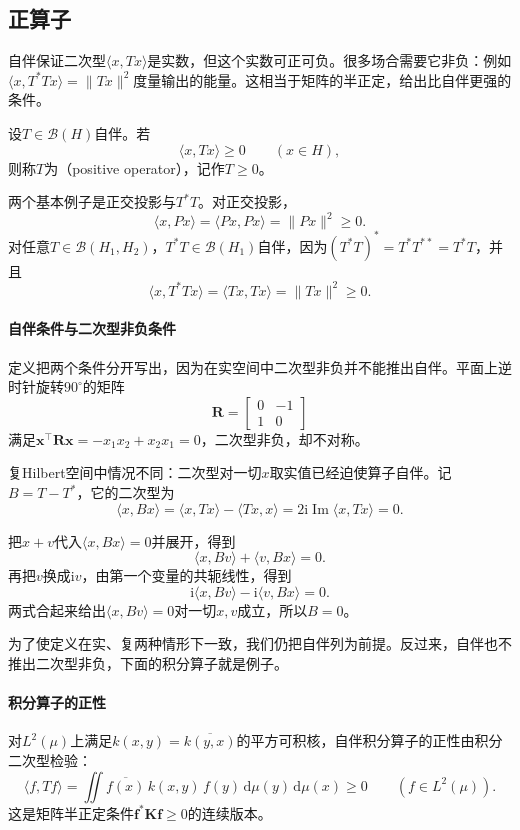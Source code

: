 \subsection{正算子}
\label{sec:lop-positive}

自伴保证二次型$\langle x,Tx\rangle$是实数，但这个实数可正可负。很多场合需要它非负：例如$\langle x,T^*Tx\rangle=\lVert Tx\rVert^2$度量输出的能量。这相当于矩阵的半正定，给出比自伴更强的条件。

\begin{definition}[正算子]
\label{def:lop-positive-operator}
设$T\in\mathcal B(H)$自伴。若
\begin{equation}
 \langle x,Tx\rangle\geq0\qquad(x\in H),
 \label{eq:lop-positive}
\end{equation}
则称$T$为（positive operator），记作$T\geq0$。
\end{definition}

两个基本例子是正交投影与$T^*T$。对正交投影，
\[
 \langle x,Px\rangle=\langle Px,Px\rangle=\lVert Px\rVert^2\geq0.
\]
对任意$T\in\mathcal B(H_1,H_2)$，$T^*T\in\mathcal B(H_1)$自伴，因为$(T^*T)^*=T^*T^{**}=T^*T$，并且
\[
 \langle x,T^*Tx\rangle=\langle Tx,Tx\rangle=\lVert Tx\rVert^2\geq0.
\]

\paragraph{自伴条件与二次型非负条件}
定义把两个条件分开写出，因为在实空间中二次型非负并不能推出自伴。平面上逆时针旋转$90^\circ$的矩阵
\[
 \bm R=\begin{bmatrix}0&-1\\1&0\end{bmatrix}
\]
满足$\bm x^{\top}\bm R\bm x=-x_1x_2+x_2x_1=0$，二次型非负，却不对称。

复Hilbert空间中情况不同：二次型对一切$x$取实值已经迫使算子自伴。记$B=T-T^*$，它的二次型为
\[
 \langle x,Bx\rangle=\langle x,Tx\rangle-\langle Tx,x\rangle=2\mathrm i\operatorname{Im}\langle x,Tx\rangle=0.
\]

把$x+v$代入$\langle x,Bx\rangle=0$并展开，得到
\[
 \langle x,Bv\rangle+\langle v,Bx\rangle=0.
\]
再把$v$换成$\mathrm iv$，由第一个变量的共轭线性，得到
\[
 \mathrm i\langle x,Bv\rangle-\mathrm i\langle v,Bx\rangle=0.
\]
两式合起来给出$\langle x,Bv\rangle=0$对一切$x,v$成立，所以$B=0$。

为了使定义在实、复两种情形下一致，我们仍把自伴列为前提。反过来，自伴也不推出二次型非负，下面的积分算子就是例子。

\paragraph{积分算子的正性}
对$L^2(\mu)$上满足$k(x,y)=\overline{k(y,x)}$的平方可积核，自伴积分算子的正性由积分二次型检验：
\begin{equation}
 \langle f,Tf\rangle=\iint\overline{f(x)}\,k(x,y)\,f(y)\,\mathrm d\mu(y)\,\mathrm d\mu(x)\geq0\qquad(f\in L^2(\mu)).
 \label{eq:lop-integral-positive}
\end{equation}
这是矩阵半正定条件$\bm f^*\bm K\bm f\geq0$的连续版本。

